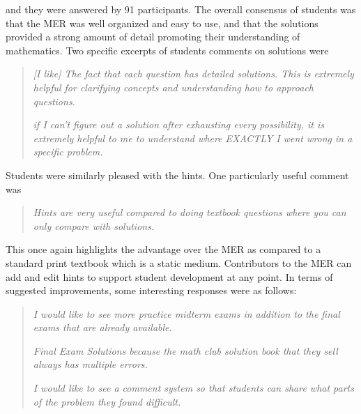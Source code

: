 \documentclass{primus}
\begin{document}
\noindent{}and they were answered by 91 participants. The overall consensus of students was that the MER was well organized and easy to use, and that the solutions provided a strong amount of detail promoting their understanding of mathematics. Two specific excerpts of students comments on solutions were

\begin{quote}
\textit{[I like] The fact that each question has detailed solutions. This is extremely helpful for clarifying concepts and understanding how to approach questions.}

\textit{if I can't figure out a solution after exhausting every possibility, it is extremely helpful to me to understand where EXACTLY I went wrong in a specific problem.}
\end{quote}

\noindent{}Students were similarly pleased with the hints. One particularly useful comment was

\begin{quote}
\textit{Hints are very useful compared to doing textbook questions where you can only compare with solutions.}
\end{quote}

\noindent{}This once again highlights the advantage over the MER as compared to a standard print textbook which is a static medium. Contributors to the MER can add and edit hints to support student development at any point. In terms of suggested improvements, some interesting responses were as follows:

\begin{quote}
\textit{I would like to see more practice midterm exams in addition to the final exams that are already available.}

\textit{Final Exam Solutions because the math club solution book that they sell always has multiple errors.}

\textit{I would like to see a comment system so that students can share what parts of the problem they found difficult.}
\end{quote}
\end{document}
